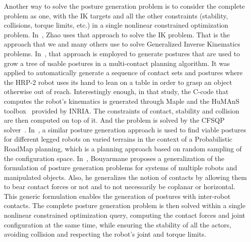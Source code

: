 Another way to solve the posture generation problem is to consider the complete problem as one, with the IK targets and all the other constraints (stability, collisions, torque limits, etc.) in a single nonlinear constrained optimization problem.
In~\cite{Zhao1994}, Zhao uses that approach to solve the IK problem.
That is the approach that we and many others use to solve Generalized Inverse Kinematics problems.
In~\cite{escande:iros:2006}, that approach is employed to generate postures that are used to grow a tree of usable postures in a multi-contact planning algorithm.
It was applied to automatically generate a sequence of contact sets and postures where the HRP-2 robot uses its hand to lean on a table in order to grasp an object otherwise out of reach.
Interestingly enough, in that study, the C-code that computes the robot's kinematics is generated through Maple and the HuMAnS toolbox~\cite{wieber2006humans} provided by INRIA.
The constraints of contact, stability and collision are then computed on top of it.
And the problem is solved by the CFSQP solver~\cite{cfsqp:manual}.
In~\cite{hauser:ijrr:2008}, a similar posture generation approach is used to find viable postures for different legged robots on varied terrains in the context of a Probabilistic RoadMap planning, which is a planning approach based on random sampling of the configuration space.
In~\cite{bouyarmane2010static}, Bouyarmane proposes a generalization of the formulation of posture generation problems for systems of multiple robots and manipulated objects.
Also, he generalizes the notion of contacts by allowing them to bear contact forces or not and to not necessarily be coplanar or horizontal.
This generic formulation enables the generation of postures with inter-robot contacts.
The complete posture generation problem is then solved within a single nonlinear constrained optimization query, computing the contact forces and joint configuration at the same time, while ensuring the stability of all the actors, avoiding collision and respecting the robot's joint and torque limits.

